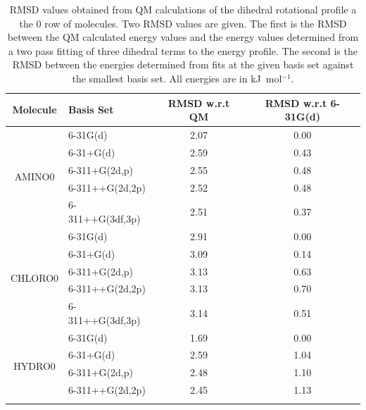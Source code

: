\documentclass[11pt, oneside, draft]{article}   	%
\begin{document}
\begin{table}[p]
\centering
\caption{RMSD values obtained from QM calculations of the dihedral rotational profile a the 0 row of molecules. Two RMSD values are given. The first is the RMSD between the QM calculated energy values and the energy values determined from a two pass fitting of three dihedral terms to the energy profile. The second is the RMSD between the energies determined from fits at the given basis set against the smallest basis set. All energies are in kJ~mol$^{-1}$.}
\label{tb:basis_set_rmsd}
\begin{tabular}{|c|l|c|c|}
\hline
Molecule                 & Basis Set        & RMSD w.r.t QM & RMSD w.r.t 6-31G(d) \\ \hline
\multirow{5}{*}{AMINO0}  & 6-31G(d)         & 2.07          & 0.00                \\ \cline{2-4} 
                         & 6-31+G(d)        & 2.59          & 0.43                \\ \cline{2-4} 
                         & 6-311+G(2d,p)    & 2.55          & 0.48                \\ \cline{2-4} 
                         & 6-311++G(2d,2p)  & 2.52          & 0.48                \\ \cline{2-4} 
                         & 6-311++G(3df,3p) & 2.51          & 0.37                \\ \hline
\multirow{5}{*}{CHLORO0} & 6-31G(d)         & 2.91          & 0.00                \\ \cline{2-4} 
                         & 6-31+G(d)        & 3.09          & 0.14                \\ \cline{2-4} 
                         & 6-311+G(2d,p)    & 3.13          & 0.63                \\ \cline{2-4} 
                         & 6-311++G(2d,2p)  & 3.13          & 0.70                \\ \cline{2-4} 
                         & 6-311++G(3df,3p) & 3.14          & 0.51                \\ \hline
\multirow{5}{*}{HYDRO0}  & 6-31G(d)         & 1.69          & 0.00                \\ \cline{2-4} 
                         & 6-31+G(d)        & 2.59          & 1.04                \\ \cline{2-4} 
                         & 6-311+G(2d,p)    & 2.48          & 1.10                \\ \cline{2-4} 
                         & 6-311++G(2d,2p)  & 2.45          & 1.13                \\ \cline{2-4} 

\end{tabular}
\end{table}
\end{document}
